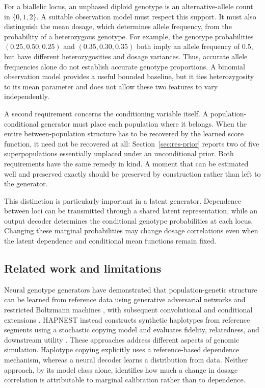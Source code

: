 \documentclass[11pt,a4paper]{article}
\begin{document}
For a biallelic locus, an unphased diploid genotype is an alternative-allele
count in $\{0,1,2\}$. A suitable observation model must respect this support.
It must also distinguish the mean dosage, which determines allele frequency,
from the probability of a heterozygous genotype. For example, the genotype
probabilities $(0.25,0.50,0.25)$ and $(0.35,0.30,0.35)$ both imply an allele
frequency of $0.5$, but have different heterozygosities and dosage variances.
Thus, accurate allele frequencies alone do not establish accurate genotype
proportions. A binomial observation model provides a useful bounded baseline,
but it ties heterozygosity to its mean parameter and does not allow these two
features to vary independently.

A second requirement concerns the conditioning variable itself. A
population-conditional generator must place each population where it belongs.
When the entire between-population structure has to be recovered by the learned
score function, it need not be recovered at all: Section~\ref{sec:res-prior}
reports two of five superpopulations essentially unplaced under an
unconditional prior. Both requirements have the same remedy in kind. A moment
that can be estimated well and preserved exactly should be preserved by
construction rather than left to the generator.

This distinction is particularly important in a latent generator. Dependence
between loci can be transmitted through a shared latent representation, while
an output decoder determines the conditional genotype probabilities at each
locus. Changing these marginal probabilities may change dosage correlations
even when the latent dependence and conditional mean functions remain fixed.

\subsection{Related work and limitations}
\label{sec:related}

Neural genotype generators have demonstrated that population-genetic structure
can be learned from reference data using generative adversarial networks and
restricted Boltzmann machines \citep{Yelmen2021}, with subsequent convolutional
and conditional extensions \citep{Yelmen2023}. HAPNEST instead constructs
synthetic haplotypes from reference segments using a stochastic copying model
and evaluates fidelity, relatedness, and downstream utility
\citep{Wharrie2023}. These approaches address different aspects of genomic
simulation. Haplotype copying explicitly uses a reference-based dependence
mechanism, whereas a neural decoder learns a distribution from data. Neither
approach, by its model class alone, identifies how much a change in dosage
correlation is attributable to marginal calibration rather than to dependence.
\end{document}
